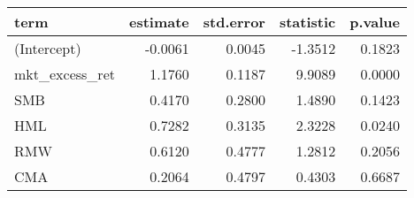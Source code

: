 \begin{table}[ht]
\centering
\begin{tabular}{lrrrr}
  \hline
term & estimate & std.error & statistic & p.value \\ 
  \hline
(Intercept) & -0.0061 & 0.0045 & -1.3512 & 0.1823 \\ 
  mkt\_excess\_ret & 1.1760 & 0.1187 & 9.9089 & 0.0000 \\ 
  SMB & 0.4170 & 0.2800 & 1.4890 & 0.1423 \\ 
  HML & 0.7282 & 0.3135 & 2.3228 & 0.0240 \\ 
  RMW & 0.6120 & 0.4777 & 1.2812 & 0.2056 \\ 
  CMA & 0.2064 & 0.4797 & 0.4303 & 0.6687 \\ 
   \hline
\end{tabular}
\end{table}

